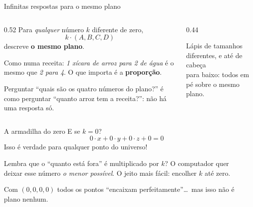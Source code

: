 \documentclass[aspectratio=169,11pt]{beamer}
\newcommand{\bnum}[1]{\textbf{\textcolor{mTeal}{#1}}}
\begin{document}
\begin{frame}{Infinitas respostas para o mesmo plano}
  \begin{columns}[c]
    \begin{column}{0.52\textwidth}
      Para \emph{qualquer} número $k$ diferente de zero,
      \[ k \cdot (A, B, C, D) \]
      descreve \bnum{o mesmo plano}.
      \bigskip

      Como numa receita: \emph{1 xícara de arroz para 2 de água} é o mesmo que
      \emph{2 para 4}. O que importa é a \bnum{proporção}.
      \bigskip

      Perguntar ``quais são os quatro números do plano?'' é como perguntar
      ``quanto arroz tem a receita?'': \alert{não há uma resposta só}.
    \end{column}
    \begin{column}{0.44\textwidth}
      \centering
      \smallskip

      {\scriptsize\textcolor{mStoneMid}{Lápis de tamanhos diferentes, e até de cabeça\\
      para baixo: todos em pé sobre o mesmo plano.}}
    \end{column}
  \end{columns}
\end{frame}

\begin{frame}{A armadilha do zero}
  E se $k = 0$?
  \[ 0\cdot x + 0\cdot y + 0\cdot z + 0 = 0 \]
  \pause
  Isso é verdade para \alert{qualquer ponto do universo}!
  \bigskip

  \begin{armadilha}[title={Por que o computador cai nessa}]
    Lembra que o ``quanto está fora'' é multiplicado por $k$? O computador quer deixar esse
    número \emph{o menor possível}. O jeito mais fácil: \alert{encolher $k$ até zero}.
    \medskip

    Com $(0, 0, 0, 0)$ todos os pontos ``encaixam perfeitamente''\ldots\
    mas isso \alert{não é plano nenhum}.
  \end{armadilha}
\end{frame}
\end{document}
